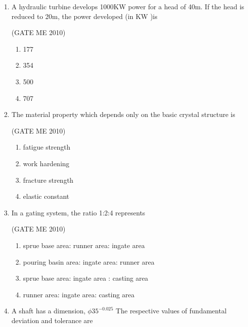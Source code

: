 \documentclass[journal,12pt,onecolumn]{IEEEtran}
\theoremstyle{remark}
\begin{document}
\begin{enumerate}
\item A hydraulic turbine develops 1000KW power for a head of 40m. If the head is reduced to 20m, the power developed (in KW )is


 \hfill{(GATE ME 2010)}\\
 
\begin{multicols}{4}
    \begin{enumerate}
        \item 177
\item 354
\item 500
\item 707
    \end{enumerate}
\end{multicols}

\item The material property which depends only on the basic crystal structure is

 \hfill{(GATE ME 2010)}\\
 
\begin{multicols}{2}
    \begin{enumerate}
        \item  fatigue strength
\item work hardening
\item  fracture strength
\item  elastic constant
    \end{enumerate}
\end{multicols}

\item In a gating system, the ratio 1:2:4 represents

 \hfill{(GATE ME 2010)}\\
 
    \begin{enumerate}
        \item  sprue base area: runner area: ingate area
\item pouring basin area: ingate area: runner area
\item sprue base area: ingate area : casting area
\item runner area: ingate area: casting area
    \end{enumerate}
 



\item A shaft has a dimension, $\phi35^{-0.025}$ \; The respective values of fundamental deviation and tolerance are


\end{enumerate}
\end{document}
